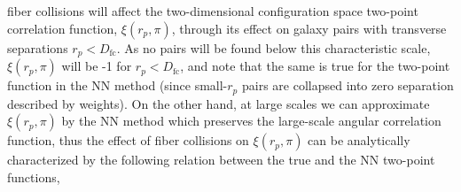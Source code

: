                                                                                                                                                                                                                                                                           fiber collisions will affect the two-dimensional configuration space two-point 
                                                                                                                                                                                                                                                                          correlation function, $\xi(r_p, \pi)$, through its effect on galaxy pairs with 
                                                                                                                                                                                                                                                                          transverse separations $r_p < D_\mathrm{fc}$. As no pairs will be found 
                                                                                                                                                                                                                                                                          below this characteristic scale, $\xi(r_p, \pi)$ will be -1 
                                                                                                                                                                                                                                                                          for $r_p < D_\mathrm{fc}$, and note that  the same is true for the two-point function in the NN method (since small-$r_p$ pairs are collapsed into zero separation described by weights). On the other hand, at large scales we can approximate $\xi(r_p, \pi)$ by the NN method which preserves the large-scale angular correlation function, thus 
                                                                                                                                                                                                                                                                          the effect of fiber collisions on $\xi(r_p, \pi)$ can be analytically characterized by  the following relation between the true and the NN two-point functions,
